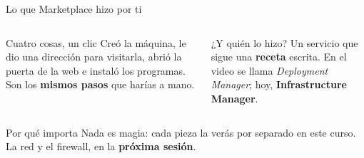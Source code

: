 \documentclass[aspectratio=169,10pt,c]{beamer}
\begin{document}
\begin{frame}{Lo que Marketplace hizo por ti}
\begin{center}
\end{center}
\begin{columns}[T,onlytextwidth]
\begin{block}{Cuatro cosas, un clic}
\small Creó la máquina, le dio una dirección para visitarla, abrió la puerta de la web e instaló los programas. Son los \textbf{mismos pasos} que harías a mano.
\end{block}
\begin{exampleblock}{¿Y quién lo hizo?}
\small Un servicio que sigue una \textbf{receta} escrita. En el video se llama \emph{Deployment Manager}; hoy, \textbf{Infrastructure Manager}.
\end{exampleblock}
\end{columns}
\par\vspace{1mm}
\begin{alertblock}{Por qué importa}
\small Nada es magia: cada pieza la verás por separado en este curso. La red y el firewall, en la \textbf{próxima sesión}.
\end{alertblock}
\end{frame}
\end{document}
